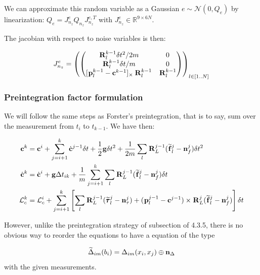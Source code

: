 \documentclass[11pt]{article}
\newcommand{\Rot}[2]{\prescript{#1}{}{\bfR}_{#2}}
\newcommand{\noise}{\bfn}
\newcommand{\posi}[2]{\prescript{#1}{}{\bfp}_{#2}}
\newcommand{\forcem}[2]{\prescript{#1}{}{\widetilde{\bff}}_{#2}}
\newcommand{\torquem}[2]{\prescript{#1}{}{\widetilde{\pmb{\tau}}}_{#2}}
\newcommand{\AM}{\mathcal{L}}
\newcommand{\COM}{\bfc}
\newcommand{\COMd}{\dot{\bfc}}
\newcommand{\Gaussian}[2]{\mathcal{N}({#1},{#2})}
\newcommand{\Reals}{\mathbb{R}}
\begin{document}
We can approximate this random variable as a Gaussian $e \sim \Gaussian{0}{Q_e}$ by linearization: $Q_e = J^e_{n_z} Q_{n_z} J^{e,T}_{n_z}$ with $J^e_{n_z} \in \Reals^{9 \times 6N}$.

The jacobian with respect to noise variables is then:

\begin{equation}
	J^e_{n_z}=
	\left(
	\begin{pmatrix}
	\Rot{}{l}^{k-1} \delta t^2/2m & 0
	\\
	\Rot{}{l}^{k-1} \delta t/m & 0
	\\
	[\posi{}{l}^{k-1} - \COM^{k-1}]_{\times} \Rot{}{l}^{k-1} & \Rot{}{l}^{k-1}
	\end{pmatrix}
	\right)_{l \in [1..N]}
\end{equation}


\subsubsection{Preintegration factor formulation}

We will follow the same steps as Forster's preintegration, that is to say, sum over the measurement from $t_i$ to $t_{k-1}$. We have then:





\begin{equation}
\begin{split}
	\COM^{k} &= \COM^{i} + \sum_{j=i+1}^{k}\COMd^{j-1} \delta t 
	+ \frac{1}{2} \bfg \delta t^2 + \frac{1}{2m} \sum_l \Rot{}{L}^{j-1} (\forcem{}{l}^{j} - \noise_f^{j}) \delta t^2
	\\
	\COMd^{k}&= \COMd^{i} + \bfg \Delta t_{ik} + \frac{1}{m}  \sum_{j=i+1}^{k} \sum_l \Rot{}{L}^{j-1} (\forcem{}{l}^{j} - \noise_f^{j}) \delta t 
	\\
	\AM_c^{k} &= \AM_c^{i} +  \sum_{j=i+1}^{k} \left[ 
	\sum_l \Rot{}{L}^{j-1}(\torquem{}{l}^{j} - \noise_{\tau}^{j}) + (\posi{}{l}^{j-1} - \COM^{j-1}) \times \Rot{}{L}^{j}(\forcem{}{l}^{j} - \noise_f^{j}) 
	\right] \delta t
\end{split}
\label{eq:COMDiscreteFeet}
\end{equation}


However, unlike the preintegration strategy of subsection of 4.3.5, there is no obvious way to reorder the equations to have a equation of the type

\begin{equation}
\widetilde{\Delta}_{im}(b_i) = \Delta_{im}(x_i, x_j) \oplus  \noise_{\Delta} 
\end{equation}
with the given measurements. 
\end{document}
